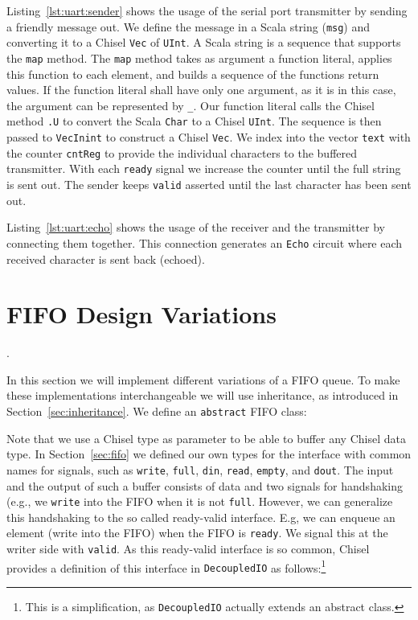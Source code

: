 \documentclass[%
    10pt,
    headinclude, footexclude,
    openright, %
    notitlepage,
    cleardoubleempty,
    headsepline,
    pointlessnumbers,
    bibtotoc, idxtotoc,
    ]{scrbook}
\newcommand{\code}[1]{{\small{\texttt{#1}}}}
\newcommand{\codefoot}[1]{{\footnotesize{\texttt{#1}}}}
\begin{document}
Listing~\ref{lst:uart:sender} shows the usage of the serial port transmitter
by sending a friendly message out. We define the message in a Scala
string (\code{msg}) and converting it to a Chisel \code{Vec} of \code{UInt}.
A Scala string is a sequence that supports the \code{map} method.
The \code{map} method takes as argument a function literal, applies this function to
each element, and builds a sequence of the functions return values.
If the function literal shall have only one argument, as it is in this case, the
argument can be represented by \code{\_}. Our function literal calls
the Chisel method \code{.U} to convert the Scala \code{Char} to a Chisel
\code{UInt}. The sequence is then passed to \code{VecInint} to construct
a Chisel \code{Vec}. We index into the vector \code{text} with the counter
\code{cntReg} to provide the individual characters to the buffered transmitter.
With each \code{ready} signal we increase the counter until the full string
is sent out. The sender keeps \code{valid} asserted until the last character
has been sent out.

Listing~\ref{lst:uart:echo} shows the usage of the receiver and the transmitter
by connecting them together. This connection generates an \code{Echo} circuit where each
received character is sent back (echoed).

\section{FIFO Design Variations}
\label{sec:more:fifo}.

In this section we will implement different variations of a FIFO queue.
To make these implementations interchangeable we will use inheritance,
as introduced in Section~\ref{sec:inheritance}. We define an \code{abstract}
FIFO class:


\noindent Note that we use a Chisel type as parameter to be able to buffer
any Chisel data type.
In Section~\ref{sec:fifo} we defined our own types for the interface with common
names for signals, such as \code{write}, \code{full}, \code{din}, \code{read},
\code{empty}, and \code{dout}. The input and the output of such a buffer consists
of data and two signals for handshaking (e.g., we \code{write} into the FIFO when
it is not \code{full}.
However, we can generalize this handshaking to the so called ready-valid interface.
E.g, we can enqueue an element (write into the FIFO) when the FIFO is \code{ready}.
We signal this at the writer side with \code{valid}.
As this ready-valid interface is so common, Chisel provides a definition
of this interface in \code{DecoupledIO} as follows:\footnote{This is a simplification,
as \codefoot{DecoupledIO} actually extends an abstract class.}
\end{document}
